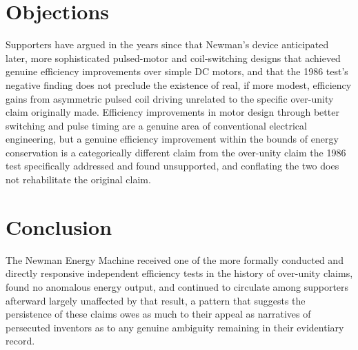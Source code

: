 \documentclass[11pt]{article}
\begin{document}
\section{Objections}

Supporters have argued in the years since that Newman's device anticipated later, more sophisticated pulsed-motor and coil-switching designs that achieved genuine efficiency improvements over simple DC motors, and that the 1986 test's negative finding does not preclude the existence of real, if more modest, efficiency gains from asymmetric pulsed coil driving unrelated to the specific over-unity claim originally made. Efficiency improvements in motor design through better switching and pulse timing are a genuine area of conventional electrical engineering, but a genuine efficiency improvement within the bounds of energy conservation is a categorically different claim from the over-unity claim the 1986 test specifically addressed and found unsupported, and conflating the two does not rehabilitate the original claim.

\section{Conclusion}

The Newman Energy Machine received one of the more formally conducted and directly responsive independent efficiency tests in the history of over-unity claims, found no anomalous energy output, and continued to circulate among supporters afterward largely unaffected by that result, a pattern that suggests the persistence of these claims owes as much to their appeal as narratives of persecuted inventors as to any genuine ambiguity remaining in their evidentiary record.
\end{document}
